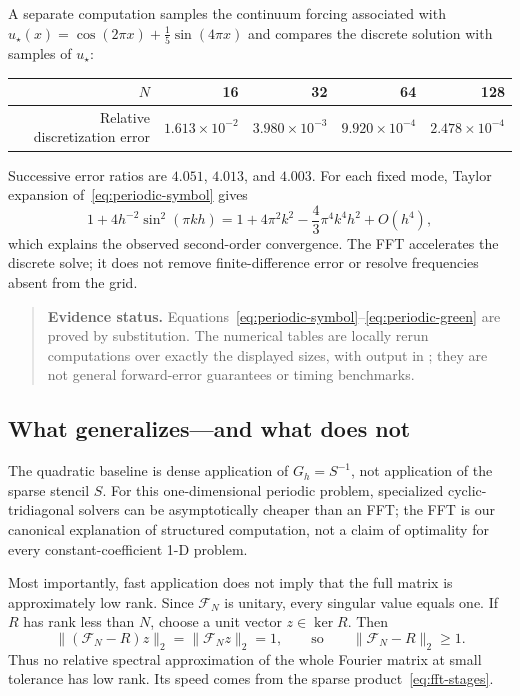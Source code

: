 \documentclass[11pt,a4paper]{article}
\numberwithin{equation}{section}
\newenvironment{evidence}{\begin{quote}\small\color{muted}\textbf{Evidence status.} }{\end{quote}}
\begin{document}
A separate computation samples the continuum forcing associated with $u_\star(x)=\cos(2\pi x)+\tfrac15\sin(4\pi x)$ and compares the discrete solution with samples of $u_\star$:
\begin{center}
\begin{tabular}{@{}rrrrr@{}}
\toprule
$N$ & 16 & 32 & 64 & 128\\
\midrule
Relative discretization error & $1.613\times10^{-2}$ & $3.980\times10^{-3}$ & $9.920\times10^{-4}$ & $2.478\times10^{-4}$\\
\bottomrule
\end{tabular}
\end{center}
Successive error ratios are $4.051$, $4.013$, and $4.003$. For each fixed mode, Taylor expansion of~\eqref{eq:periodic-symbol} gives
\[
 1+4h^{-2}\sin^2(\pi kh)
 =1+4\pi^2k^2-\frac43\pi^4k^4h^2+O(h^4),
\]
which explains the observed second-order convergence. The FFT accelerates the discrete solve; it does not remove finite-difference error or resolve frequencies absent from the grid.
\begin{evidence}
Equations~\eqref{eq:periodic-symbol}--\eqref{eq:periodic-green} are proved by substitution. The numerical tables are locally rerun computations over exactly the displayed sizes, with output in ; they are not general forward-error guarantees or timing benchmarks.
\end{evidence}

\subsection{What generalizes---and what does not}
The quadratic baseline is dense application of $G_h=S^{-1}$, not application of the sparse stencil $S$. For this one-dimensional periodic problem, specialized cyclic-tridiagonal solvers can be asymptotically cheaper than an FFT; the FFT is our canonical explanation of structured computation, not a claim of optimality for every constant-coefficient 1-D problem.

Most importantly, fast application does not imply that the full matrix is approximately low rank. Since $\mathcal F_N$ is unitary, every singular value equals one. If $R$ has rank less than $N$, choose a unit vector $z\in\ker R$. Then
\begin{equation}
 \|(\mathcal F_N-R)z\|_2=\|\mathcal F_Nz\|_2=1,
 \qquad\text{so}\qquad \|\mathcal F_N-R\|_2\ge1.
 \label{eq:fft-full-rank}
\end{equation}
Thus no relative spectral approximation of the whole Fourier matrix at small tolerance has low rank. Its speed comes from the sparse product~\eqref{eq:fft-stages}.
\end{document}
